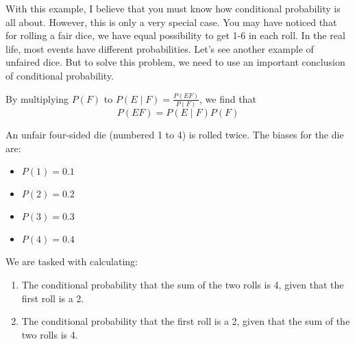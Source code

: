 With this example, I believe that you must know how conditional probability is all about. However, this is only a very special case. 
You may have noticed that for rolling a fair dice, we have equal possibility to get 1-6 in each roll. In the real life, most events have different probabilities. Let's see another example of unfaired dice.
But to solve this problem, we need to use an important conclusion of conditional probability.
\begin{corollary}\label{intersectascond}
    By multiplying $P(F)$ to \( P(E \mid F) = \frac{P(EF)}{P(F)} \), we find that 
    \begin{equation}\label{intasprob}
        P(EF) = P(E \mid F)P(F)
    \end{equation}
\end{corollary}
\begin{example}\label{unfair_dice}
    An unfair four-sided die (numbered 1 to 4) is rolled twice. The biases for the die are:
    \begin{itemize}
        \item \( P(1) = 0.1 \)
        \item \( P(2) = 0.2 \)
        \item \( P(3) = 0.3 \)
        \item \( P(4) = 0.4 \)
    \end{itemize}
    We are tasked with calculating:
    \begin{enumerate}
        \item The conditional probability that the sum of the two rolls is 4, given that the first roll is a 2.
        \item The conditional probability that the first roll is a 2, given that the sum of the two rolls is 4.
    \end{enumerate}
\end{example}
